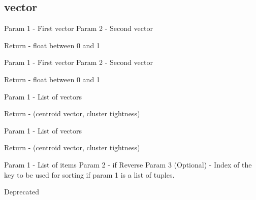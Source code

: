\subsection{vector}
{Param 1 - First vector
Param 2 - Second vector

Return - float between 0 and 1}
{Param 1 - First vector
Param 2 - Second vector

Return - float between 0 and 1}
{Param 1 - List of vectors

Return - (centroid vector, cluster tightness)}
{Param 1 - List of vectors

Return - (centroid vector, cluster tightness)}
{Param 1 - List of items
Param 2 - if Reverse
Param 3 (Optional) - Index of the key to be used for sorting
if param 1 is a list of tuples.

Deprecated}
